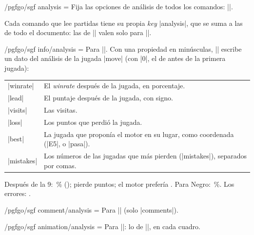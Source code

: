 \begin{key}{/pgfgo/sgf analysis = }
	Fija las opciones de análisis de todos los comandos: ||.
\end{key}

Cada comando que lee partidas tiene su propia \emph{key} |analysis|, que se suma a las de todo el documento: las de || valen solo para |\sgfdiagrams|.

\begin{key}{/pgfgo/sgf info/analysis = }
	Para |\sgfinfo|. Con una propiedad en minúsculas, |\sgfinfo| escribe un dato del análisis de la jugada |move| (con |0|, el de antes de la primera jugada):

	\begin{center}
		\small
		\begin{tabular}{lp{9cm}}
			|winrate| & El \emph{winrate} después de la jugada, en porcentaje. \\
			|lead| & El puntaje después de la jugada, con signo. \\
			|visits| & Las visitas. \\
			|loss| & Los puntos que perdió la jugada. \\
			|best| & La jugada que proponía el motor en su lugar, como coordenada (|E5|, o |pasa|). \\
			|mistakes| & Los números de las jugadas que más pierden (|mistakes|), separados por comas. \\
		\end{tabular}
	\end{center}

	\begin{codeexample}[]
		Después de la 9: \,\%
		(); pierde
		 puntos; el motor
		prefería . Para Negro:
		\,\%.
		Los errores: .
	\end{codeexample}
\end{key}

\begin{key}{/pgfgo/sgf comment/analysis = }
	Para |\sgfcomment| (solo |comments|).
\end{key}

\begin{key}{/pgfgo/sgf animation/analysis = }
	Para |\sgfanimation|: lo de |\sgf|, en cada cuadro.
\end{key}

